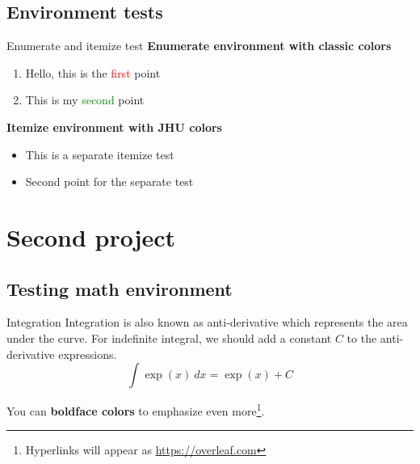 \documentclass[xcolor=dvipsnames,aspectratio=\AspectRatio,\BaseFontSize]{beamer}
\numberwithin{equation}{section}        %
\newcommand{\BLUE}{\textcolor{JHUDeepBlue}}
\newcommand{\PURPLE}{\textcolor{JHUPurple}}
\newcommand{\RED}{\textcolor{Red}}
\newcommand{\GREEN}{\textcolor{Green}}
\begin{document}
\subsection{Environment tests}
\begin{frame}{Enumerate and itemize test}
    \textbf{Enumerate environment with classic colors}
    \begin{enumerate}
        \item Hello, this is the \RED{first} point
        \item This is my \GREEN{second} point
    \end{enumerate}
    
    \vspace{0.5in}
    
    \textbf{Itemize environment with JHU colors}
    \begin{itemize}
        \item This is a separate \BLUE{itemize} test 
        \item Second point for the \PURPLE{separate} test
    \end{itemize}
\end{frame}
\section{Second project}
\subsection{Testing math environment}
\begin{frame}{Integration}
    Integration is also known as anti-derivative which represents the area under the curve. For indefinite integral, we should add a constant $C$ to the anti-derivative expressions.
    \begin{equation*}
        \int \exp(x) \ dx = \exp(x) + C
    \end{equation*}
    
    You can \textbf{\BLUE{boldface colors}} to emphasize even more\footnote{Hyperlinks will appear as \url{https://overleaf.com}}.
   
\end{frame}


\end{document}
